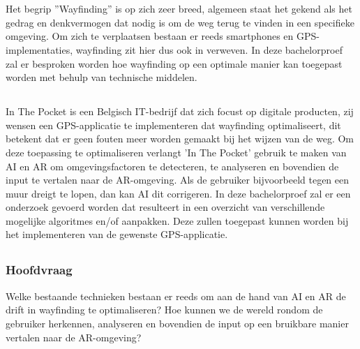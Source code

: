 \chapter{}
\label{ch:inleiding}

\section{}
\label{sec:wayfinding}
Het begrip ''Wayfinding'' is op zich zeer breed, algemeen staat het gekend als het gedrag en denkvermogen dat nodig is om de weg terug te vinden in een specifieke omgeving. Om zich te verplaatsen bestaan er reeds smartphones en GPS-implementaties, wayfinding zit hier dus ook in verweven. In deze bachelorproef zal er besproken worden hoe wayfinding op een optimale manier kan toegepast worden met behulp van technische middelen.

\section{}
\label{sec:probleemstelling}

In The Pocket is een Belgisch IT-bedrijf dat zich focust op digitale producten, zij wensen een GPS-applicatie te implementeren dat wayfinding optimaliseert, dit betekent dat er geen fouten meer worden gemaakt bij het wijzen van de weg. Om deze toepassing te optimaliseren verlangt 'In The Pocket' gebruik te maken van AI en AR om omgevingsfactoren te detecteren, te analyseren en bovendien de input te vertalen naar de AR-omgeving. Als de gebruiker bijvoorbeeld tegen een muur dreigt te lopen, dan kan AI dit corrigeren. In deze bachelorproef zal er een onderzoek gevoerd worden dat resulteert in een overzicht van verschillende mogelijke algoritmes en/of aanpakken. Deze zullen toegepast kunnen worden bij het implementeren van de gewenste GPS-applicatie.

\section{}
\label{sec:onderzoeksvraag}

\subsection{Hoofdvraag}
Welke bestaande technieken bestaan er reeds om aan de hand van AI en AR de drift in wayfinding te optimaliseren? Hoe kunnen we de wereld rondom de gebruiker herkennen, analyseren en bovendien de input op een bruikbare manier vertalen naar de AR-omgeving?

